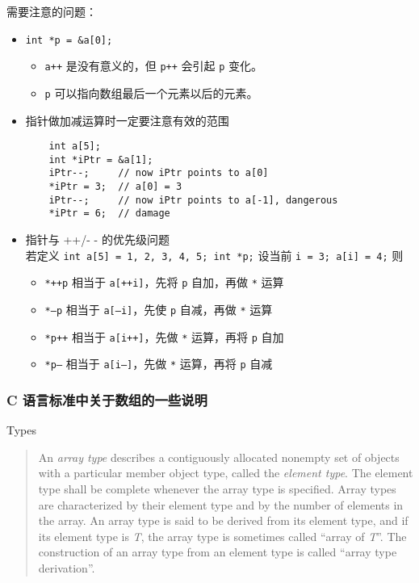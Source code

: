 \documentclass[UTF8]{ctexart}
\begin{document}
需要注意的问题：
\begin{itemize}
    \item \texttt{int *p = &a[0];}
    \begin{itemize}
        \item \texttt{a++} 是没有意义的，但 \texttt{p++} 会引起 \texttt{p} 变化。
        \item \texttt{p} 可以指向数组最后一个元素以后的元素。
    \end{itemize}
    \item 指针做加减运算时一定要注意有效的范围
    \begin{verbatim}
    int a[5];
    int *iPtr = &a[1];
    iPtr--;     // now iPtr points to a[0]
    *iPtr = 3;  // a[0] = 3
    iPtr--;     // now iPtr points to a[-1], dangerous
    *iPtr = 6;  // damage
    \end{verbatim}
    \item 指针与 ++/- - 的优先级问题 \\
    若定义 \texttt{int a[5] = {1, 2, 3, 4, 5}; int *p;}
    设当前 \texttt{i = 3; a[i] = 4;} 则
    \begin{itemize}
        \item \texttt{*++p} 相当于 \texttt{a[++i]}，先将 \texttt{p} 自加，再做 \texttt{*} 运算
        \item \texttt{*--p} 相当于 \texttt{a[--i]}，先使 \texttt{p} 自减，再做 \texttt{*} 运算
        \item \texttt{*p++} 相当于 \texttt{a[i++]}，先做 \texttt{*} 运算，再将 \texttt{p} 自加
        \item \texttt{*p--} 相当于 \texttt{a[i--]}，先做 \texttt{*} 运算，再将 \texttt{p} 自减
    \end{itemize}
\end{itemize}

\subsubsection{C 语言标准中关于数组的一些说明}
Types
\begin{quote}
    An \emph{array type} describes a contiguously allocated nonempty set of objects with a
    particular member object type, called the \emph{element type}. The element type shall be
    complete whenever the array type is specified. Array types are characterized by their element
    type and by the number of elements in the array. An array type is said to be derived from its
    element type, and if its element type is \emph{T}, the array type is sometimes called ``array of
    \emph{T}''. The construction of an array type from an element type is called ``array type
    derivation''.
\end{quote}
\end{document}
